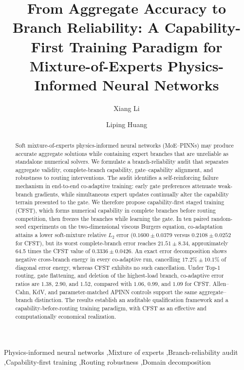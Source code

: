 \documentclass[preprint,12pt]{elsarticle}
\theoremstyle{remark}
\begin{document}
\begin{frontmatter}
\title{From Aggregate Accuracy to Branch Reliability: A Capability-First Training Paradigm for Mixture-of-Experts Physics-Informed Neural Networks}
\author[1]{Xiang Li}
\author[1]{Liping Huang}
\address[1]{Henan University of Economics and Law, Zhengzhou, China}

\begin{abstract}
Soft mixture-of-experts physics-informed neural networks (MoE--PINNs) may produce accurate aggregate solutions while containing expert branches that are unreliable as standalone numerical solvers. We formulate a branch-reliability audit that separates aggregate validity, complete-branch capability, gate--capability alignment, and robustness to routing interventions. The audit identifies a self-reinforcing failure mechanism in end-to-end co-adaptive training: early gate preferences attenuate weak-branch gradients, while simultaneous expert updates continually alter the capability terrain presented to the gate. We therefore propose capability-first staged training (CFST), which forms numerical capability in complete branches before routing competition, then freezes the branches while learning the gate. In ten paired random-seed experiments on the two-dimensional viscous Burgers equation, co-adaptation attains a lower soft-mixture relative $L_2$ error ($0.1600\pm0.0379$ versus $0.2108\pm0.0252$ for CFST), but its worst complete-branch error reaches $21.51\pm8.34$, approximately 64.5 times the CFST value of $0.3336\pm0.0426$. An exact error decomposition shows negative cross-branch energy in every co-adaptive run, cancelling $17.2\%\pm10.1\%$ of diagonal error energy, whereas CFST exhibits no such cancellation. Under Top-1 routing, gate flattening, and deletion of the highest-load branch, co-adaptive error ratios are $1.38$, $2.90$, and $1.52$, compared with $1.06$, $0.99$, and $1.09$ for CFST. Allen--Cahn, KdV, and parameter-matched APINN controls support the same aggregate--branch distinction. The results establish an auditable qualification framework and a capability-before-routing training paradigm, with CFST as an effective and computationally economical realization.
\end{abstract}
\begin{keyword}
Physics-informed neural networks \sep Mixture of experts \sep Branch-reliability audit \sep Capability-first training \sep Routing robustness \sep Domain decomposition
\end{keyword}
\end{frontmatter}
\end{document}

